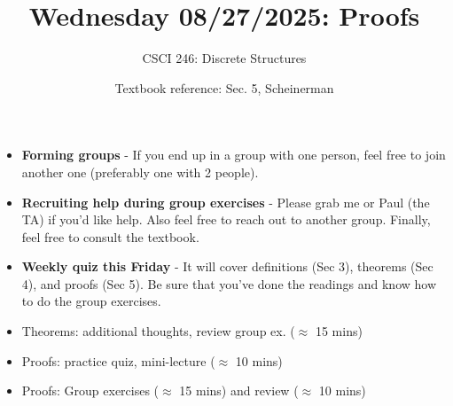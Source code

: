 \documentclass[10pt]{beamer}
\begin{document}






\title{Wednesday 08/27/2025: Proofs}
\author{CSCI 246: Discrete Structures}
\date{Textbook reference: Sec. 5, Scheinerman}

\begin{frame}
    \titlepage 
\end{frame}


\begin{frame}

\begin{mygreenbox}[title=Announcements]
\begin{itemize}
\item \textbf{Forming groups} - If you end up in a group with one person, feel free to join another one (preferably one with 2 people).
\item \textbf{Recruiting help during group exercises} - Please grab me or Paul (the TA) if you'd like help.  Also feel free to reach out to another group. Finally, feel free to consult the textbook.
\item \textbf{Weekly quiz this Friday} - It will cover definitions (Sec 3), theorems (Sec 4), and proofs (Sec 5).  Be sure that you've done the readings and know how to do the group exercises. 
\end{itemize}

\end{mygreenbox}

\vfill  \vfill 


\begin{myyellowbox}[title=Today's Agenda]
\begin{itemize}
	\item Theorems: additional thoughts, review group ex. ($\approx$ 15 mins)
	\item Proofs: practice quiz, mini-lecture ($\approx$ 10 mins)
	\item Proofs: Group exercises ($\approx$ 15 mins) and review ($\approx$ 10 mins)
\end{itemize}


\end{myyellowbox}
\vfill 

\end{frame}
\end{document}
